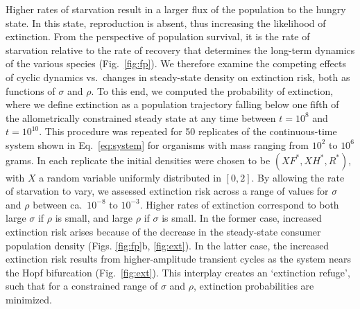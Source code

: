 \documentclass[twocolumn,preprintnumbers,amsmath,amssymb,superscriptaddress]{revtex4}
\begin{document}
\begin{bibunit}[unsrt]
  Higher rates of starvation result in a larger flux of the population to the hungry state.
  In this state, reproduction is absent, thus increasing the likelihood of extinction.  From the perspective of population survival, it is the rate of starvation relative to the rate of recovery that determines the long-term dynamics of the various species (Fig.~\ref{fig:fp}).
  We therefore examine the competing effects of cyclic dynamics vs.\ changes in steady-state density on extinction risk, both as functions of $\sigma$ and $\rho$.
  To this end, we computed the probability of extinction, where we define extinction as a population trajectory falling below one fifth of the allometrically constrained steady state at any time between $t=10^8$ and $t=10^{10}$.
  This procedure was repeated for 50 replicates of the continuous-time system shown in Eq.~\ref{eq:system} for organisms with mass ranging from $10^2$ to $10^6$ grams.
  In each replicate the initial densities were chosen to be $(XF^*,XH^*,R^*)$,
  with $X$ a random variable uniformly distributed in $[0,2]$.  By allowing the
  rate of starvation to vary, we assessed extinction risk across a range of
  values for $\sigma$ and $\rho$ between ca.\ $10^{-8}$ to
  $10^{-3}$. %
  Higher rates of extinction correspond to both large $\sigma$ if $\rho$ is
  small, and large $\rho$ if $\sigma$ is small.  In the former case, increased
  extinction risk arises because of the decrease in the steady-state consumer
  population density (Figs. \ref{fig:fp}b, \ref{fig:ext}).  In the latter case,
  the increased extinction risk results from higher-amplitude transient cycles
  as the system nears the Hopf bifurcation (Fig.~\ref{fig:ext}).  This
  interplay creates an `extinction refuge', such that for a constrained range
  of $\sigma$ and $\rho$, extinction probabilities are minimized.


\end{bibunit}
\end{document}
